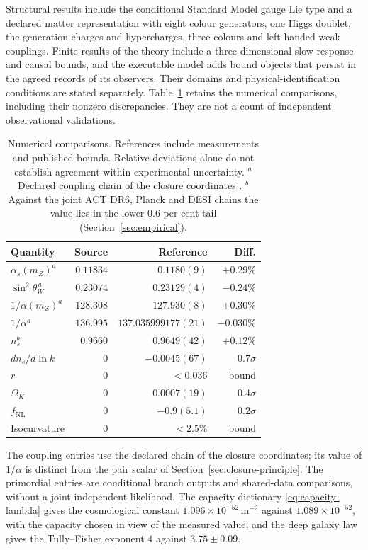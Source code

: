 \documentclass[11pt]{article}
\theoremstyle{definition}
\theoremstyle{remark}
\begin{document}
Structural results include the conditional Standard Model gauge Lie type
and a declared matter representation with eight colour generators, one
Higgs doublet, the generation charges and hypercharges, three colours and
left-handed weak couplings. Finite results of the theory include
a three-dimensional slow response and causal bounds, and the executable
model adds bound objects that persist in the agreed records of its
observers. Their domains and
physical-identification conditions are stated separately.
Table~\ref{tab:matches} retains the numerical comparisons, including their
nonzero discrepancies. They are not a count of independent observational
validations.

\begin{table}[!htb]
\centering\small
\caption{Numerical comparisons. References include measurements and
published bounds. Relative deviations alone do not establish agreement
within experimental uncertainty. $^{a}$Declared coupling chain of the
closure coordinates \cite{ophalpha}. $^{b}$Against the joint ACT DR6,
Planck and DESI chains the value lies in the lower $0.6$ per cent tail
(Section~\ref{sec:empirical}).}
\label{tab:matches}
\begin{tabular}{@{}lrrr@{}}
\toprule
\textbf{Quantity} & \textbf{Source} & \textbf{Reference} & \textbf{Diff.}\\
\midrule
$\alpha_s(m_Z)^{a}$ & $0.11834$ & $0.1180(9)$ & $+0.29\%$\\
$\sin^2\theta_W^{\,a}$ & $0.23074$ & $0.23129(4)$ & $-0.24\%$\\
$1/\alpha(m_Z)^{a}$ & $128.308$ & $127.930(8)$ & $+0.30\%$\\
$1/\alpha^{a}$ & $136.995$ & $137.035999177(21)$ & $-0.030\%$\\
$n_s^{b}$ & $0.9660$ & $0.9649(42)$ & $+0.12\%$\\
$dn_s/d\ln k$ & $0$ & $-0.0045(67)$ & $0.7\sigma$\\
$r$ & $0$ & $<0.036$ & bound\\
$\Omega_K$ & $0$ & $0.0007(19)$ & $0.4\sigma$\\
$f_{\mathrm{NL}}$ & $0$ & $-0.9(5.1)$ & $0.2\sigma$\\
Isocurvature & $0$ & $<2.5\%$ & bound\\
\bottomrule
\end{tabular}
\end{table}

The coupling entries use the declared chain of the closure coordinates;
its value of $1/\alpha$ is distinct from the pair scalar of
Section~\ref{sec:closure-principle}. The primordial entries are
conditional branch outputs and shared-data comparisons, without a joint
independent likelihood. The capacity dictionary
\eqref{eq:capacity-lambda} gives the cosmological constant
$1.096\times10^{-52}\,\mathrm{m}^{-2}$ against $1.089\times10^{-52}$, with
the capacity chosen in view of the measured value, and the deep galaxy law
gives the Tully--Fisher exponent $4$ against $3.75\pm0.09$.
\end{document}
